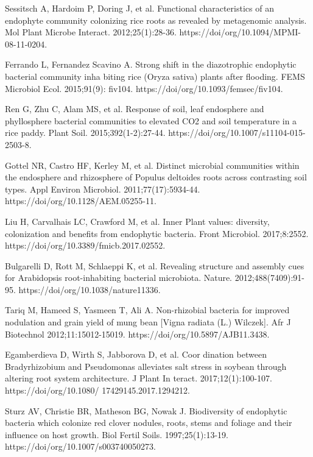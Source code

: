 \documentclass[11pt]{article}
\begin{document}
\begin{thebibliography}{3}
		 Sessitsch A, Hardoim P, Doring J, et al. Functional characteristics of an endophyte community colonizing rice roots as revealed by metagenomic analysis. Mol Plant Microbe Interact. 2012;25(1):28-36. https://doi/org/10.1094/MPMI-08-11-0204.
		
		 Ferrando L, Fernandez Scavino A. Strong shift in the diazotrophic endophytic bacterial community inha biting rice (Oryza sativa) plants after flooding. FEMS Microbiol Ecol. 2015;91(9): fiv104. https://doi/org/10.1093/femsec/fiv104.
		
		 Ren G, Zhu C, Alam MS, et al. Response of soil, leaf endosphere and phyllosphere bacterial communities to elevated CO2 and soil temperature in a rice paddy. Plant Soil. 2015;392(1-2):27-44. https://doi/org/10.1007/s11104-015-2503-8.
		
		 Gottel NR, Castro HF, Kerley M, et al. Distinct microbial communities within the endosphere and rhizosphere of Populus deltoides roots across contrasting soil types. Appl Environ Microbiol. 2011;77(17):5934-44. https://doi/org/10.1128/AEM.05255-11.
		
		 Liu H, Carvalhais LC, Crawford M, et al. Inner Plant values: diversity, colonization and benefits from endophytic bacteria. Front Microbiol. 2017;8:2552. https://doi/org/10.3389/fmicb.2017.02552.
		
		 Bulgarelli D, Rott M, Schlaeppi K, et al. Revealing structure and assembly cues for Arabidopsis root-inhabiting bacterial microbiota. Nature. 2012;488(7409):91-95. https://doi/org/10.1038/nature11336.
		
		 Tariq M, Hameed S, Yasmeen T, Ali A. Non-rhizobial bacteria for improved nodulation and grain yield of mung bean [Vigna radiata (L.) Wilczek]. Afr J Biotechnol 2012;11:15012-15019. https://doi/org/10.5897/AJB11.3438.
		
		 Egamberdieva D, Wirth S, Jabborova D, et al. Coor dination between Bradyrhizobium and Pseudomonas alleviates salt stress in soybean through altering root system architecture. J Plant In teract. 2017;12(1):100-107. https://doi/org/10.1080/ 17429145.2017.1294212.
		
		 Sturz AV, Christie BR, Matheson BG, Nowak J. Biodiversity of endophytic bacteria which colonize red clover nodules, roots, stems and foliage and their influence on host growth. Biol Fertil Soils. 1997;25(1):13-19. https://doi/org/10.1007/s003740050273.
		

\end{thebibliography}
\end{document}
